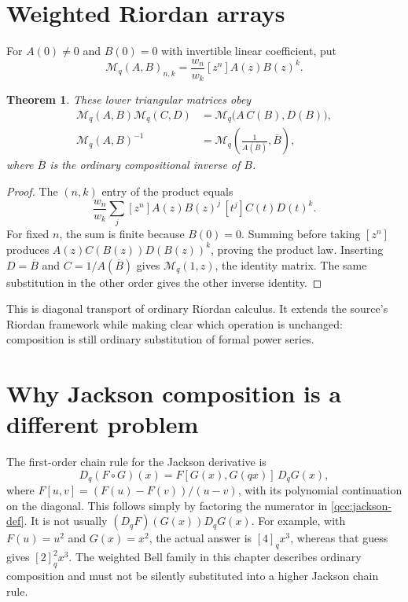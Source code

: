 \documentclass[11pt,a4paper,oneside,openany]{book}
\newtheorem{theorem}{Theorem}[chapter]
\theoremstyle{definition}
\theoremstyle{remark}
\begin{document}
\section{Weighted Riordan arrays}
For \(A(0)\ne0\) and \(B(0)=0\) with invertible linear coefficient, put
\begin{equation}\label{qcc:riordan-def}
 \mathcal M_q(A,B)_{n,k}=\frac{w_n}{w_k}[z^n]A(z)B(z)^k.
\end{equation}
\begin{theorem}\label{qcc:riordan-group}
These lower triangular matrices obey
\begin{align}
 \mathcal M_q(A,B)\mathcal M_q(C,D)
 &=\mathcal M_q\bigl(A\,C(B),D(B)\bigr),\label{qcc:riordan-product}\\
 \mathcal M_q(A,B)^{-1}
 &=\mathcal M_q\left(\frac1{A(\overline B)},\overline B\right),
 \label{qcc:riordan-inverse}
\end{align}
where \(\overline B\) is the ordinary compositional inverse of \(B\).
\end{theorem}
\begin{proof}
The \((n,k)\) entry of the product equals
\[
 \frac{w_n}{w_k}\sum_j[z^n]A(z)B(z)^j\,[t^j]C(t)D(t)^k.
\]
For fixed \(n\), the sum is finite because \(B(0)=0\). Summing before taking
\([z^n]\) produces \(A(z)C(B(z))D(B(z))^k\), proving the product law.
Inserting \(D=\overline B\) and \(C=1/A(\overline B)\) gives
\(\mathcal M_q(1,z)\), the identity matrix. The same substitution in the other
order gives the other inverse identity.
\end{proof}
This is diagonal transport of ordinary Riordan calculus. It extends the source's
Riordan framework while making clear which operation is unchanged: composition
is still ordinary substitution of formal power series.

\section{Why Jackson composition is a different problem}
The first-order chain rule for the Jackson derivative is
\begin{equation}\label{qcc:divided-chain}
 D_q(F\circ G)(x)=F[G(x),G(qx)]\,D_qG(x),
\end{equation}
where \(F[u,v]=(F(u)-F(v))/(u-v)\), with its polynomial continuation on the
diagonal. This follows simply by factoring the numerator in
\eqref{qcc:jackson-def}. It is not usually \((D_qF)(G(x))D_qG(x)\).
For example, with \(F(u)=u^2\) and \(G(x)=x^2\), the actual answer is
\([4]_qx^3\), whereas that guess gives \([2]_q^2x^3\).
The weighted Bell family in this chapter describes ordinary composition and
must not be silently substituted into a higher Jackson chain rule.
\end{document}
